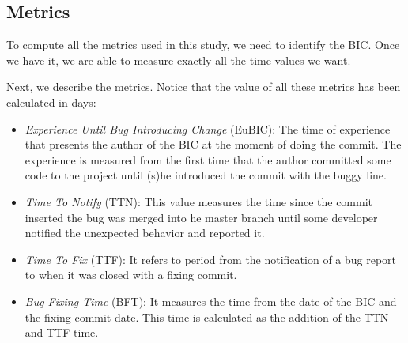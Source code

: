 \documentclass[10pt, conference]{IEEEtran}
\begin{document}
\subsection{Metrics}

To compute all the metrics used in this study, we need to identify the BIC. Once we have it, we are able to measure exactly all the time values we want.  

Next, we describe the metrics. Notice that the value of all these metrics has been calculated in days: 

\begin{itemize}
		\item \emph{Experience Until Bug Introducing Change} (EuBIC): The time of experience that presents the author of the BIC at the moment of doing the commit. The experience is measured from the first time that the author committed some code to the project until (s)he introduced the commit with the buggy line.
		\item \emph{Time To Notify} (TTN): This value measures the time since the commit inserted the bug was merged into he master branch until some developer notified the unexpected behavior and reported it. 
		\item \emph{Time To Fix} (TTF): It refers to period from the notification of a bug report to when it was closed with a fixing commit.
		\item \emph{Bug Fixing Time} (BFT): It measures the time from the date of the BIC and the fixing commit date. This time is calculated as the addition of the TTN and TTF time.
\end{itemize} 
\end{document}
